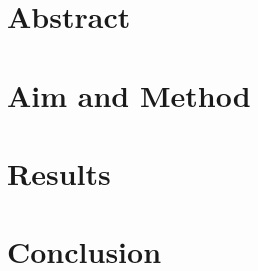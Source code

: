 \documentclass{thelongcat-report}
\begin{document}
\maketitle
\section{Abstract}


\section{Aim and Method}


\section{Results}


\section{Conclusion}


\begin{thebibliography}{1}

\end{thebibliography}

\appendix
{}
\end{document}
